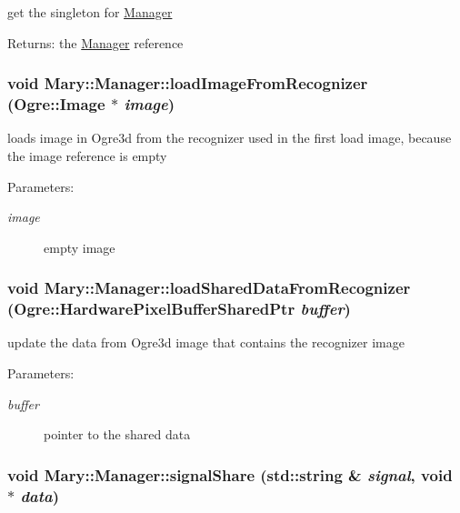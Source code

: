 get the singleton for \hyperlink{class_mary_1_1_manager}{Manager} \begin{Desc}
\item[Returns:]the \hyperlink{class_mary_1_1_manager}{Manager} reference \end{Desc}
\hypertarget{class_mary_1_1_manager_a0092d09a8fbcd8969242ad257ba1cb6}{
\subsubsection[loadImageFromRecognizer]{\setlength{\rightskip}{0pt plus 5cm}void Mary::Manager::loadImageFromRecognizer (Ogre::Image $\ast$ {\em image})}}
\label{class_mary_1_1_manager_a0092d09a8fbcd8969242ad257ba1cb6}


loads image in Ogre3d from the recognizer used in the first load image, because the image reference is empty \begin{Desc}
\item[Parameters:]
\begin{description}
\item[{\em image}]empty image \end{description}
\end{Desc}
\hypertarget{class_mary_1_1_manager_d1c3a719937335e1357dd600b10d815d}{
\subsubsection[loadSharedDataFromRecognizer]{\setlength{\rightskip}{0pt plus 5cm}void Mary::Manager::loadSharedDataFromRecognizer (Ogre::HardwarePixelBufferSharedPtr {\em buffer})}}
\label{class_mary_1_1_manager_d1c3a719937335e1357dd600b10d815d}


update the data from Ogre3d image that contains the recognizer image \begin{Desc}
\item[Parameters:]
\begin{description}
\item[{\em buffer}]pointer to the shared data \end{description}
\end{Desc}
\hypertarget{class_mary_1_1_manager_3f86e2f7f44b0f1ff78f92e6e6987dd8}{
\subsubsection[signalShare]{\setlength{\rightskip}{0pt plus 5cm}void Mary::Manager::signalShare (std::string \& {\em signal}, \/  void $\ast$ {\em data})}}
\label{class_mary_1_1_manager_3f86e2f7f44b0f1ff78f92e6e6987dd8}



